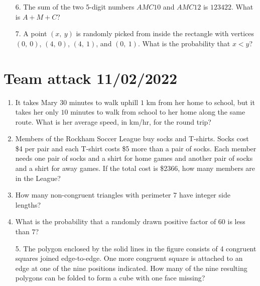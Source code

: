 \documentclass[12pt]{article}
\begin{document}
  \begin{enumerate}[leftmargin=3mm]
    \item[6.] The sum of the two 5-digit numbers $AMC10$ and $AMC12$ is $123422$. What is $A+M+C$?
    \item[7.] A point $(x,\ y)$ is randomly picked from inside the rectangle with vertices $(0,\ 0)$, $(4,\ 0)$, $(4,\ 1)$, and $(0,\ 1)$. What is the probability that $x<y$?
  \end{enumerate}

  \newpage
  \section*{Team attack 11/02/2022}
  \begin{enumerate}[leftmargin=3mm]
    \item It takes Mary $30$ minutes to walk uphill $1$ km from her home to school, but it takes her only $10$ minutes to walk from school to her home along the same route. What is her average speed, in km/hr, for the round trip?
    \item Members of the Rockham Soccer League buy socks and T-shirts. Socks cost \$4 per pair and each T-shirt costs \$5 more than a pair of socks. Each member needs one pair of socks and a shirt for home games and another pair of socks and a shirt for away games. If the total cost is \$2366, how many members are in the League?
    \item How many non-congruent triangles with perimeter $7$ have integer side lengths?
    \item What is the probability that a randomly drawn positive factor of $60$ is less than $7$?
  \end{enumerate}
  \begin{minipage}{0.25\textwidth}
    \begin{enumerate}[leftmargin=3mm]
      \item[5.] The polygon enclosed by the solid lines in the figure consists of 4 congruent squares joined edge-to-edge. One more congruent square is attached to an edge at one of the nine positions indicated. How many of the nine resulting polygons can be folded to form a cube with one face missing?
    \end{enumerate}
  \end{minipage}\qquad
\end{document}
